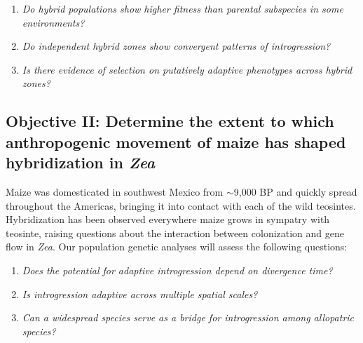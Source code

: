 \begin{enumerate}
\item \emph{Do hybrid populations show higher fitness than parental subspecies in some environments?}
\item \emph{Do independent hybrid zones show convergent patterns of introgression?}
\item \emph{Is there evidence of selection on putatively adaptive phenotypes across hybrid zones?}
\end{enumerate}

\subsection*{Objective II: Determine the extent to which anthropogenic movement of maize has shaped hybridization in \emph{Zea}}
Maize was domesticated in southwest Mexico from \zp{} $\sim$9,000 BP \citep{Matsuoka2002} and quickly spread throughout the Americas, bringing it into contact with each of the wild teosintes.
Hybridization has been observed everywhere maize grows in sympatry with teosinte, raising questions about the interaction between colonization and gene flow in \emph{Zea}.
Our population genetic analyses will assess the following questions:
\begin{enumerate}
\item \emph{Does the potential for adaptive introgression depend on divergence time?}
\item \emph{Is introgression adaptive across multiple spatial scales?}
\item \emph{Can a widespread species serve as a bridge for introgression among allopatric species?} 
\end{enumerate}

